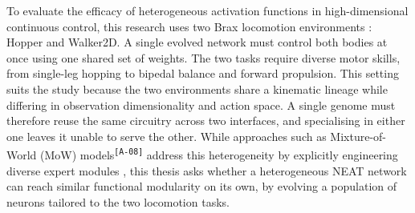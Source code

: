 \documentclass[12pt]{article}
\newcommand{\revID}[1]{\textsuperscript{\scriptsize\texttt{[#1]}}}
\newcommand{\revAcro}[2]{\textcolor{lrPurple}{#2}\revID{#1}}    %
\begin{document}
To evaluate the efficacy of heterogeneous activation functions in high-dimensional continuous control, this research uses two Brax locomotion environments \parencite{freeman_brax_2021}: Hopper and Walker2D.
A single evolved network must control both bodies at once using one shared set of weights.
The two tasks require diverse motor skills, from single-leg hopping to bipedal balance and forward propulsion.
This setting suits the study because the two environments share a kinematic lineage while differing in observation dimensionality and action space. A single genome must therefore reuse the same circuitry across two interfaces, and specialising in either one leaves it unable to serve the other.
While approaches such as \revAcro{A-08}{Mixture-of-World (MoW) models} address this heterogeneity by explicitly engineering diverse expert modules \parencite{zhang_mixtureofworld_2026}, this thesis asks whether a heterogeneous NEAT network can reach similar functional modularity on its own, by evolving a population of neurons tailored to the two locomotion tasks.



\end{document}
